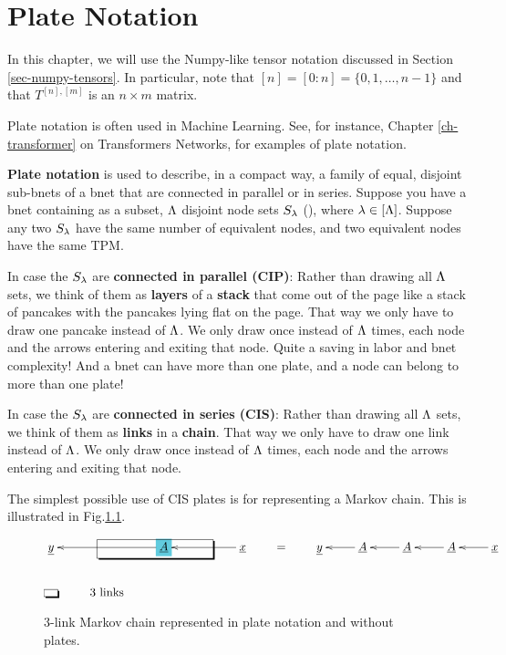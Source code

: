 \chapter{Plate Notation}
\label{ch-plates}

In this chapter, we
will use the Numpy-like tensor notation
discussed in Section 
\ref{sec-numpy-tensors}. In particular, note that $[n] = [0:n] = \{0, 1,\ldots, n-1\}$ and that $T^{[n], [m]}$ is an $n\times m$ matrix.

Plate notation is often used in Machine Learning. See, for instance,
Chapter \ref{ch-transformer} on Transformers Networks, for  examples of plate notation.


{\bf Plate notation} is used to describe, in a compact way, a family of 
equal, disjoint  sub-bnets of a bnet that are connected in parallel or in series.
Suppose you have a bnet containing as a subset, $\Lambda$ disjoint node sets
$S_\lambda$ (), where
$\lambda\in [\Lambda]$. Suppose
any two $S_\lambda$ have the same number of equivalent nodes,
and two equivalent nodes have the same TPM.

In case the $S_\lambda$ are {\bf connected in parallel (CIP)}:
Rather than drawing all $\Lambda$ sets, 
we think of them as {\bf layers} of a {\bf stack}
that come out of the page like a stack of pancakes with the pancakes
lying flat on the page.
That way we only have to draw one pancake instead of $\Lambda$.
We only draw once instead of $\Lambda$ times, each node and the arrows entering and exiting
that node. Quite a saving in labor and bnet complexity! 
And a bnet can have more 
than one plate, and a node can belong
to more than one plate!

In case the $S_\lambda$ are {\bf connected in series (CIS)}: Rather than drawing all $\Lambda$ sets, 
we think of them as {\bf links} in a {\bf chain}.
That way we only have to draw one link instead of $\Lambda$.
We only draw once instead of $\Lambda$ times, each node and the arrows entering and exiting
that node. 


The simplest possible use
of CIS plates is for representing
a Markov chain. This is
illustrated in  Fig.\ref{fig-texnn-for-markov}.
\begin{figure}[h!]\centering
$$\xymatrix{
{\underline{y}}&&*+[F*:SkyBlue]{\underline{A}}\ar[ll]&&{\underline{x}}\ar[ll]
\save
\POS"1,2"."1,2"."1,4"."1,4"!C*+<1.0em>\frm{-,}
\restore
\\
*+[F-,]{\;\;}&\text{3 links}
} \quad\quad=\quad\quad \xymatrix{\rvy & \rvA\ar[l] &\rvA\ar[l] &\rvA\ar[l] & \rvx\ar[l]}$$
\caption{3-link Markov chain represented in plate notation
and without plates.}
\label{fig-texnn-for-markov}
\end{figure}


